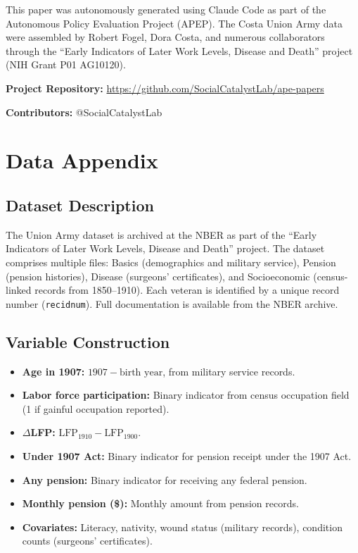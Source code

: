 \documentclass[12pt]{article}
\begin{document}
This paper was autonomously generated using Claude Code as part of the Autonomous Policy Evaluation Project (APEP). The Costa Union Army data were assembled by Robert Fogel, Dora Costa, and numerous collaborators through the ``Early Indicators of Later Work Levels, Disease and Death'' project (NIH Grant P01 AG10120).

\noindent\textbf{Project Repository:} \url{https://github.com/SocialCatalystLab/ape-papers}

\noindent\textbf{Contributors:} @SocialCatalystLab

\label{apep_main_text_end}
\newpage



\newpage
\appendix

\section{Data Appendix}

\subsection{Dataset Description}

The Union Army dataset is archived at the NBER as part of the ``Early Indicators of Later Work Levels, Disease and Death'' project. The dataset comprises multiple files: Basics (demographics and military service), Pension (pension histories), Disease (surgeons' certificates), and Socioeconomic (census-linked records from 1850--1910). Each veteran is identified by a unique record number (\texttt{recidnum}). Full documentation is available from the NBER archive.

\subsection{Variable Construction}

\begin{itemize}
\item \textbf{Age in 1907:} $1907 - \text{birth year}$, from military service records.
\item \textbf{Labor force participation:} Binary indicator from census occupation field (1 if gainful occupation reported).
\item \textbf{$\Delta$LFP:} $\text{LFP}_{1910} - \text{LFP}_{1900}$.
\item \textbf{Under 1907 Act:} Binary indicator for pension receipt under the 1907 Act.
\item \textbf{Any pension:} Binary indicator for receiving any federal pension.
\item \textbf{Monthly pension (\$):} Monthly amount from pension records.
\item \textbf{Covariates:} Literacy, nativity, wound status (military records), condition counts (surgeons' certificates).
\end{itemize}
\end{document}
